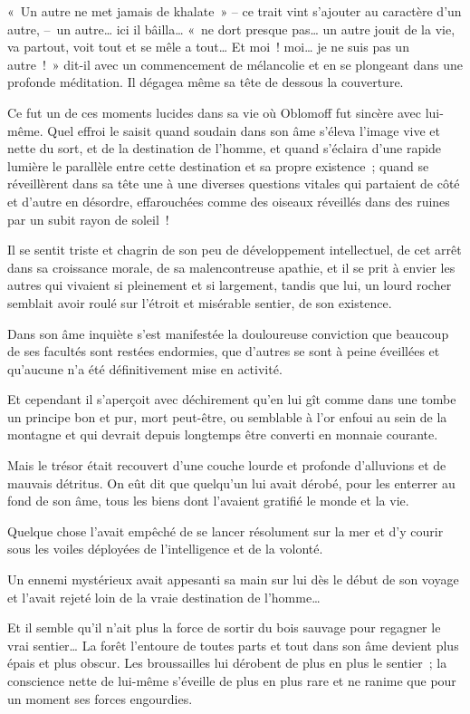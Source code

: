 \documentclass[french,twoside]{book} %
\begin{document}
« Un autre ne met jamais de khalate » – ce trait vint s’ajouter au caractère d’un autre, – un autre… ici il bâilla… « ne dort presque pas… un autre jouit de la vie, va partout, voit tout et se mêle a tout… Et moi ! moi… je ne suis pas un autre ! » dit-il avec un commencement de mélancolie et en se plongeant dans une profonde méditation. Il dégagea même sa tête de dessous la couverture.\par
Ce fut un de ces moments lucides dans sa vie où Oblomoff fut sincère avec lui-même. Quel effroi le saisit quand soudain dans son âme s’éleva l’image vive et nette du sort, et de la destination de l’homme, et quand s’éclaira d’une rapide lumière le parallèle entre cette destination et sa propre existence ; quand se réveillèrent dans sa tête une à une diverses questions vitales qui partaient de côté et d’autre en désordre, effarouchées comme des oiseaux réveillés dans des ruines par un subit rayon de soleil !\par
Il se sentit triste et chagrin de son peu de développement intellectuel, de cet arrêt dans sa croissance morale, de sa malencontreuse apathie, et il se prit à envier les autres qui vivaient si pleinement et si largement, tandis que lui, un lourd rocher semblait avoir roulé sur l’étroit et misérable sentier, de son existence.\par
Dans son âme inquiète s’est manifestée la douloureuse conviction que beaucoup de ses facultés sont restées endormies, que d’autres se sont à peine éveillées et qu’aucune n’a été définitivement mise en activité.\par
Et cependant il s’aperçoit avec déchirement qu’en lui gît comme dans une tombe un principe bon et pur, mort peut-être, ou semblable à l’or enfoui au sein de la montagne et qui devrait depuis longtemps être converti en monnaie courante.\par
Mais le trésor était recouvert d’une couche lourde et profonde d’alluvions et de mauvais détritus. On eût dit que quelqu’un lui avait dérobé, pour les enterrer au fond de son âme, tous les biens dont l’avaient gratifié le monde et la vie.\par
Quelque chose l’avait empêché de se lancer résolument sur la mer et d’y courir sous les voiles déployées de l’intelligence et de la volonté.\par
Un ennemi mystérieux avait appesanti sa main sur lui dès le début de son voyage et l’avait rejeté loin de la vraie destination de l’homme…\par
Et il semble qu’il n’ait plus la force de sortir du bois sauvage pour regagner le vrai sentier… La forêt l’entoure de toutes parts et tout dans son âme devient plus épais et plus obscur. Les broussailles lui dérobent de plus en plus le sentier ; la conscience nette de lui-même s’éveille de plus en plus rare et ne ranime que pour un moment ses forces engourdies.\par
\end{document}
